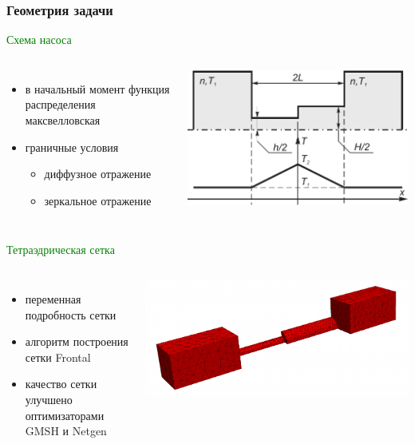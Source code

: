 \documentclass[ucs]{beamer}
\begin{document}
\begin{frame}
	\frametitle{Геометрия задачи}
	\textcolor{green}{Схема насоса}
	\begin{columns}[c]
	\column{0.55\paperwidth}
	\begin{itemize}
	\item в начальный момент функция распределения максвелловская
	\item граничные условия
	\begin{itemize}
	\item диффузное отражение
	\item зеркальное отражение
	\end{itemize}
	\end{itemize}
	\column{0.4\paperwidth}
		\includegraphics[width=\columnwidth]{pump_scheme.pdf}
	\end{columns}
	\textcolor{green}{Тетраэдрическая сетка}
	\begin{columns}[c]
	\column{0.55\paperwidth}
	\begin{itemize}
		\item переменная подробность сетки
		\item алгоритм построения сетки Frontal
		\item качество сетки улучшено оптимизаторами GMSH и Netgen
	\end{itemize}
	\column{0.4\paperwidth}
		\includegraphics[width=\columnwidth]{Mesh}
	\end{columns}
\end{frame}
\end{document}
